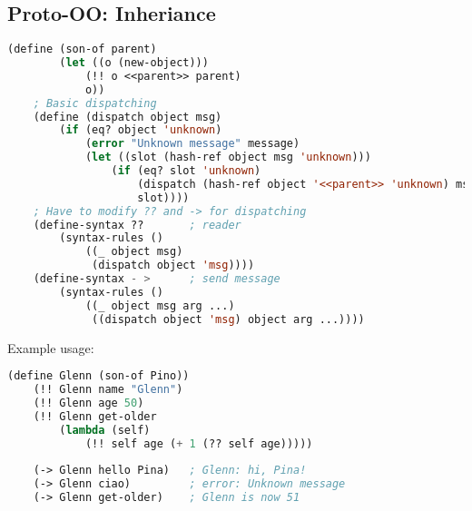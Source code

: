 \subsection{Proto-OO: Inheriance}
\begin{lstlisting}[language=Lisp]
    (define (son-of parent)
        (let ((o (new-object)))
            (!! o <<parent>> parent)
            o))
    ; Basic dispatching
    (define (dispatch object msg)
        (if (eq? object 'unknown)
            (error "Unknown message" message)
            (let ((slot (hash-ref object msg 'unknown)))
                (if (eq? slot 'unknown)
                    (dispatch (hash-ref object '<<parent>> 'unknown) msg)
                    slot))))
    ; Have to modify ?? and -> for dispatching
    (define-syntax ??       ; reader
        (syntax-rules ()
            ((_ object msg)
             (dispatch object 'msg))))
    (define-syntax - >      ; send message
        (syntax-rules ()
            ((_ object msg arg ...)
             ((dispatch object 'msg) object arg ...))))
\end{lstlisting}
Example usage:
\begin{lstlisting}[language=Lisp]
    (define Glenn (son-of Pino))
    (!! Glenn name "Glenn")
    (!! Glenn age 50)
    (!! Glenn get-older
        (lambda (self)
            (!! self age (+ 1 (?? self age)))))
    
    (-> Glenn hello Pina)   ; Glenn: hi, Pina!
    (-> Glenn ciao)         ; error: Unknown message
    (-> Glenn get-older)    ; Glenn is now 51
\end{lstlisting}